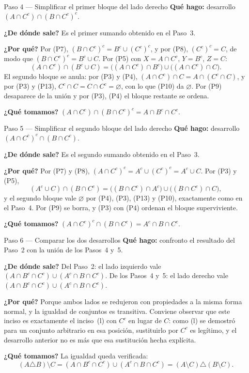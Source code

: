\documentclass[11pt]{article}
\begin{document}
\begin{paso}{Paso 4 --- Simplificar el primer bloque del lado derecho}
\textbf{Qué hago:} desarrollo $(A\cap C^{c})\cap(B\cap C^{c})^{c}$.

\textbf{¿De dónde sale?} Es el primer sumando obtenido en el Paso~3.

\textbf{¿Por qué?} Por (P7), $(B\cap C^{c})^{c}=B^{c}\cup(C^{c})^{c}$, y por (P8),
$(C^{c})^{c}=C$, de modo que $(B\cap C^{c})^{c}=B^{c}\cup C$. Por (P5) con $X=A\cap C^{c}$,
$Y=B^{c}$, $Z=C$:
\[
(A\cap C^{c})\cap(B^{c}\cup C)=\bigl((A\cap C^{c})\cap B^{c}\bigr)\cup\bigl((A\cap C^{c})\cap C\bigr).
\]
El segundo bloque se anula: por (P3) y (P4), $(A\cap C^{c})\cap C=A\cap(C^{c}\cap C)$, y por (P3)
y (P13), $C^{c}\cap C=C\cap C^{c}=\varnothing$, con lo que (P10) da $\varnothing$. Por (P9)
desaparece de la unión y por (P3), (P4) el bloque restante se ordena.

\textbf{¿Qué tomamos?} $(A\cap C^{c})\cap(B\cap C^{c})^{c}=A\cap B^{c}\cap C^{c}$.
\end{paso}

\begin{paso}{Paso 5 --- Simplificar el segundo bloque del lado derecho}
\textbf{Qué hago:} desarrollo $(A\cap C^{c})^{c}\cap(B\cap C^{c})$.

\textbf{¿De dónde sale?} Es el segundo sumando obtenido en el Paso~3.

\textbf{¿Por qué?} Por (P7) y (P8), $(A\cap C^{c})^{c}=A^{c}\cup(C^{c})^{c}=A^{c}\cup C$. Por
(P3) y (P5),
\[
(A^{c}\cup C)\cap(B\cap C^{c})=\bigl((B\cap C^{c})\cap A^{c}\bigr)\cup\bigl((B\cap C^{c})\cap C\bigr),
\]
y el segundo bloque vale $\varnothing$ por (P4), (P3), (P13) y (P10), exactamente como en el
Paso~4. Por (P9) se borra, y (P3) con (P4) ordenan el bloque superviviente.

\textbf{¿Qué tomamos?} $(A\cap C^{c})^{c}\cap(B\cap C^{c})=A^{c}\cap B\cap C^{c}$.
\end{paso}

\begin{paso}{Paso 6 --- Comparar los dos desarrollos}
\textbf{Qué hago:} confronto el resultado del Paso~2 con la unión de los Pasos~4 y~5.

\textbf{¿De dónde sale?} Del Paso~2: el lado izquierdo vale
$(A\cap B^{c}\cap C^{c})\cup(A^{c}\cap B\cap C^{c})$. De los Pasos~4 y~5: el lado derecho vale
$(A\cap B^{c}\cap C^{c})\cup(A^{c}\cap B\cap C^{c})$.

\textbf{¿Por qué?} Porque ambos lados se redujeron con propiedades a la misma forma normal, y la
igualdad de conjuntos es transitiva. Conviene observar que este inciso es exactamente el
inciso~(l) con $C^{c}$ en lugar de $C$: como (l) se demostró para un conjunto arbitrario en esa
posición, sustituirlo por $C^{c}$ es legítimo, y el desarrollo anterior no es más que esa
sustitución hecha explícita.

\textbf{¿Qué tomamos?} La igualdad queda verificada:
\[
(A\triangle B)\setminus C=(A\cap B^{c}\cap C^{c})\cup(A^{c}\cap B\cap C^{c})=(A\setminus C)\triangle(B\setminus C).
\]
\end{paso}
\end{document}
